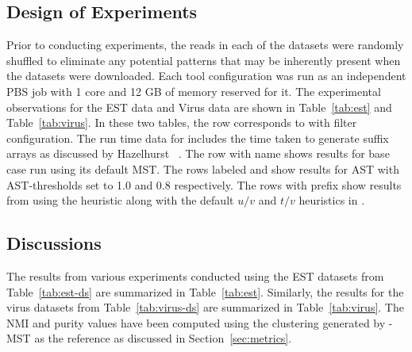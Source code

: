 \subsection{Design of Experiments}

Prior to conducting experiments, the reads in each of the datasets
were randomly shuffled to eliminate any potential patterns that may be
inherently present when the datasets were downloaded.  Each tool
configuration was run as an independent PBS job with 1 core and 12 GB
of memory reserved for it.  The experimental observations for the EST
data and Virus data are shown in Table~\ref{tab:est} and
Table~\ref{tab:virus}.  In these two tables, the row 
corresponds to  with  filter configuration.  The run
time data for  includes the time taken to generate
suffix arrays as discussed by Hazelhurst \etal~\cite{hazelhurst-11}.
The row with name  shows results for base case \peace\/ run
using its default MST.  The rows labeled  and 
show results for AST with AST-thresholds set to 1.0 and 0.8
respectively.  The rows with  prefix show results from using
the heuristic along with the default $u/v$ and $t/v$ heuristics in
\peace.

\subsection{Discussions}

The results from various experiments conducted using the EST datasets
from Table~\ref{tab:est-ds} are summarized in Table~\ref{tab:est}.
Similarly, the results for the virus datasets from
Table~\ref{tab:virus-ds} are summarized in Table~\ref{tab:virus}.  The
NMI and purity values have been computed using the clustering
generated by \peace-MST as the reference as discussed in
Section~\ref{sec:metrics}.

